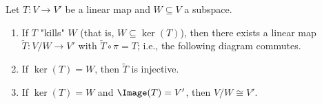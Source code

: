     \begin{theorem}
        Let $T:V \rightarrow V'$ be a linear map and $W \subseteq V$ a subspace.
        \begin{enumerate}[label = (\arabic*),itemsep=1pt,topsep=3pt]
            \item If $T$ "kills" $W$ (that is, $W \subseteq \ker(T)$), then there exists a linear map $\widetilde{T}:V/W \rightarrow V'$ with $\widetilde{T} \circ \pi = T$; i.e., the following diagram commutes.
                \begin{center}
                \end{center}

            \item If $\ker(T) = W$, then $\widetilde{T}$ is injective.
            \item If $\ker(T) = W$ and $\Image(T) = V'$, then $V/W \cong V'$.
        \end{enumerate}
    \end{theorem}
